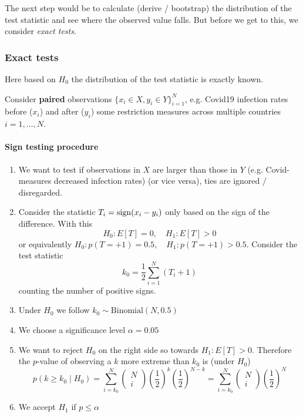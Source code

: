 The next step would be to calculate (derive / bootstrap) the distribution of the test statistic and see
where the observed value falls. But before we get to this, we consider 
\textit{exact tests}.

\subsubsection{Exact tests}
Here based on $H_0$ the distribution of the test statistic is exactly known.

Consider \textbf{paired} observations $\{ x_i \in X, y_i \in Y \}_{i=1}^N$, e.g. Covid19 infection rates before
($x_i$) and after ($y_i$) some restriction measures across multiple countries $i=1,\ldots,N$.
\paragraph*{Sign testing procedure}
\begin{enumerate}
    \item We want to test if observations in $X$ are larger than those in $Y$ (e.g. Covid-measures
    decreased infection rates) (or vice versa), ties are ignored / disregarded.
    \item Consider the statistic $T_i = \operatorname{sign}(x_i-y_i)$ only based on the sign of the difference.
    With this
    \begin{equation}
        H_0: E[T] = 0, \quad H_1: E[T] > 0
    \end{equation}
    or equivalently $H_0: p(T = +1) = 0.5, \quad H_1: p(T = +1) > 0.5$. Consider the test statistic
    \begin{equation}
        k_0 = \frac{1}{2} \sum_{i=1}^N \left( T_i + 1 \right)
    \end{equation}
    counting the number of positive signs.
    \item Under $H_0$ we follow $k_0 \sim \text{Binomial}(N,0.5)$
    \item We choose a significance level $\alpha = 0.05$
    \item We want to reject $H_0$ on the right side so towards $H_1: E[T] > 0$. Therefore
    the $p$-value of observing a $k$ more extreme than $k_0$ is (under $H_0$)
    \begin{equation}
        p\left(k \geq k_0 \mid H_0\right)=\sum_{i=k_0}^N\left(\begin{array}{c}
        N \\
        i
        \end{array}\right)\left(\frac{1}{2}\right)^k\left(\frac{1}{2}\right)^{N-k}=\sum_{i=k_0}^N\left(\begin{array}{c}
        N \\
        i
        \end{array}\right)\left(\frac{1}{2}\right)^N
        \end{equation}
    \item We accept $H_1$ if $p \leq \alpha$
\end{enumerate}

